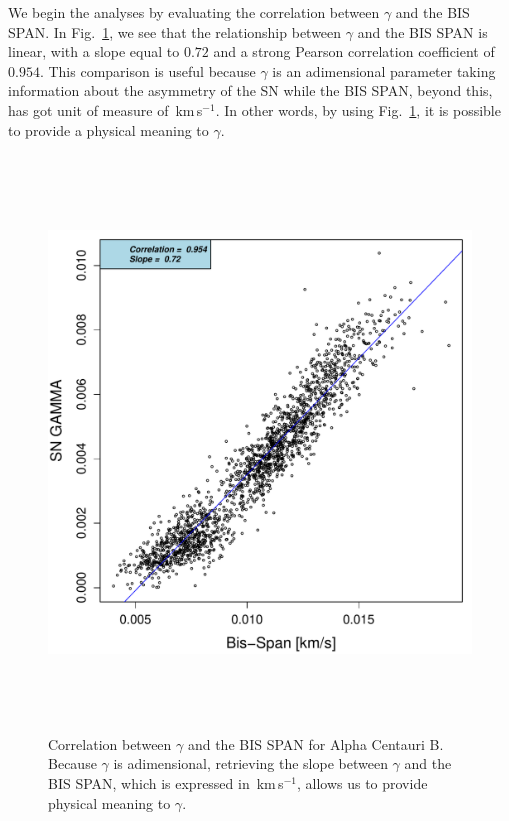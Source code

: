 \documentclass[11pt, oneside]{article}
\def\kms{\hbox{\,km\,s$^{-1}$}}       %
\begin{document}
We begin the analyses by evaluating the correlation between $\gamma$ and the BIS SPAN. In Fig.~\ref{fig:alphacent:corr.gamma}, we see that the relationship between $\gamma$ and the BIS SPAN is linear, with a slope equal to $0.72$ and a strong Pearson correlation coefficient of $0.954$. This comparison is useful because $\gamma$ is an adimensional parameter taking information about the asymmetry of the SN while the BIS SPAN, beyond this, has got unit of measure of \kms. In other words, by using Fig.~\ref{fig:alphacent:corr.gamma}, it is possible to provide a physical meaning to $\gamma$.
%
\begin{figure}[htbp]
   \centering
\includegraphics[height = 6in]{HD12862_[2]gamma_vs_bisspan.pdf} 
   \caption{Correlation between $\gamma$ and the BIS SPAN for Alpha Centauri B. Because $\gamma$ is adimensional, retrieving the slope between $\gamma$ and the BIS SPAN, which is expressed in \kms, allows us to provide physical meaning to $\gamma$.}
   \label{fig:alphacent:corr.gamma}
\end{figure}
%
\end{document}
